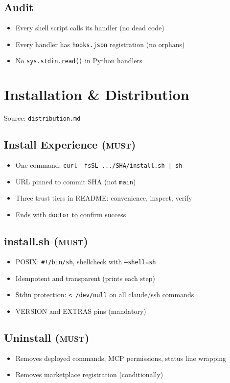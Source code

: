\documentclass[a4paper,10pt]{article}
\newcommand{\must}{\textsc{must}}
\begin{document}
\subsection{Audit}
\begin{itemize}
  \item Every shell script calls its handler (no dead code)
  \item Every handler has \texttt{hooks.json} registration (no orphans)
  \item No \texttt{sys.stdin.read()} in Python handlers
\end{itemize}

\section{Installation \& Distribution}
\label{sec:distribution}
Source: \texttt{distribution.md}

\subsection{Install Experience (\must)}
\begin{itemize}
  \item One command: \texttt{curl -fsSL .../SHA/install.sh | sh}
  \item URL pinned to commit SHA (not \texttt{main})
  \item Three trust tiers in README: convenience, inspect, verify
  \item Ends with \texttt{doctor} to confirm success
\end{itemize}

\subsection{install.sh (\must)}
\begin{itemize}
  \item POSIX: \texttt{\#!/bin/sh}, shellcheck with \texttt{--shell=sh}
  \item Idempotent and transparent (prints each step)
  \item Stdin protection: \texttt{< /dev/null} on all claude/ssh commands
  \item VERSION and EXTRAS pins (mandatory)
\end{itemize}

\subsection{Uninstall (\must)}
\begin{itemize}
  \item Removes deployed commands, MCP permissions, status line wrapping
  \item Removes marketplace registration (conditionally)
\end{itemize}
\end{document}
